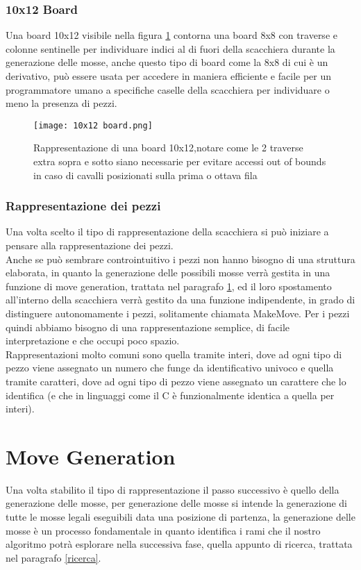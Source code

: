 \subsubsection{10x12 Board}
Una board 10x12 visibile nella figura \ref{10x12} contorna una board 8x8 con traverse e colonne sentinelle per individuare indici al di fuori della scacchiera durante la generazione delle mosse, anche questo tipo di board 
come la 8x8 di cui è un derivativo, può essere usata per accedere in maniera efficiente e facile per un programmatore umano a specifiche caselle della scacchiera per individuare o meno la presenza di pezzi.
\vfill
\begin{figure}[!ht]
    \centering
    \texttt{[image: 10x12 board.png]}
    \caption{Rappresentazione di una board 10x12,notare come le 2 traverse extra sopra e sotto siano necessarie per evitare accessi out of bounds in caso di cavalli posizionati sulla prima o ottava fila }
    \label{10x12}
\end{figure}



\subsubsection{Rappresentazione dei pezzi}
Una volta scelto il tipo di rappresentazione della scacchiera si può iniziare a pensare alla rappresentazione dei pezzi.
\\Anche se può sembrare controintuitivo i pezzi non hanno bisogno di una struttura elaborata, in quanto la generazione delle possibili
mosse verrà gestita in una funzione di move generation, trattata nel paragrafo \ref{move generation}, ed il loro spostamento all'interno della scacchiera verrà gestito da una funzione indipendente, in grado di distinguere autonomamente i pezzi, solitamente chiamata
MakeMove. Per i pezzi quindi abbiamo bisogno di una
rappresentazione semplice, di facile interpretazione e che occupi poco spazio.\\Rappresentazioni molto comuni sono quella
tramite interi, dove ad ogni tipo di pezzo viene assegnato un numero che funge da identificativo univoco e quella tramite
caratteri, dove ad ogni tipo di pezzo viene assegnato un carattere che lo identifica (e che in linguaggi come il C è funzionalmente identica a quella per interi).


\section{Move Generation}
\label{move generation} %
%
Una volta stabilito il tipo di rappresentazione il passo successivo è quello della generazione delle mosse, per generazione delle mosse si intende la generazione
di tutte le mosse legali eseguibili data una posizione di partenza, la generazione delle mosse è un processo fondamentale in quanto identifica i rami che
il nostro algoritmo potrà esplorare nella successiva fase, quella appunto di ricerca, trattata nel paragrafo \ref{ricerca}.



